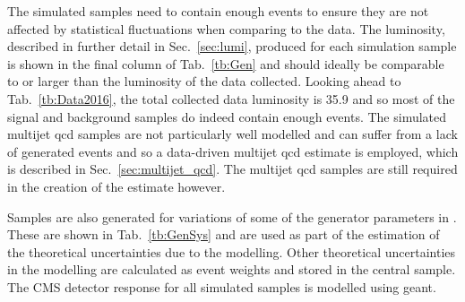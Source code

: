 The simulated samples need to contain enough events to ensure they are not affected by statistical fluctuations when comparing to the data.
The luminosity, described in further detail in Sec.~\ref{sec:lumi}, produced for each simulation sample is shown in the final column of Tab.~\ref{tb:Gen} and should ideally be comparable to or larger than the luminosity of the data collected.
Looking ahead to Tab.~\ref{tb:Data2016}, the total collected data luminosity is 35.9\fbinv{} and so most of the signal and background samples do indeed contain enough events.
The simulated multijet \acrshort{qcd} samples are not particularly well modelled and can suffer from a lack of generated events and so a data-driven multijet \acrshort{qcd} estimate is employed, which is described in Sec.~\ref{sec:multijet_qcd}.
The multijet \acrshort{qcd} samples are still required in the creation of the estimate however.

Samples are also generated for variations of some of the generator parameters in \powhegpythia{}.
These are shown in Tab.~\ref{tb:GenSys} and are used as part of the estimation of the theoretical uncertainties due to the modelling.
Other theoretical uncertainties in the modelling are calculated as event weights and stored in the central \powhegpythia{} sample.
The CMS detector response for all simulated samples is modelled using \acrshort{geant}.








